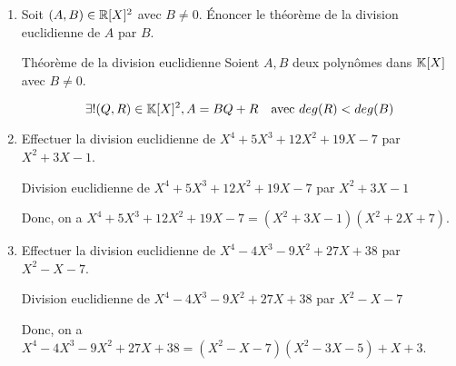 \begin{enumerate}
    \item Soit $(A, B) \in \mathbb{R}[X]^2$ avec $B \neq 0$. Énoncer le théorème de la division euclidienne de $A$ par $B$.

    \begin{theorem}[black]{Théorème de la division euclidienne}
        Soient $A, B$ deux polynômes dans $\mathbb{K}[X]$ avec $B \neq 0$.

        $$
            \exists ! (Q, R) \in \ensK[X]^2, A = BQ + R \hspace{10px} \text{avec } deg(R) < deg(B)
        $$
    \end{theorem}
    
    \item Effectuer la division euclidienne de $X^4 + 5X^3 + 12X^2 + 19X - 7$ par $X^2 + 3X - 1$.

    \begin{theorem}[black]{Division euclidienne de $X^4 + 5X^3 + 12X^2 + 19X - 7$ par $X^2 + 3X - 1$}
        \begin{center}
        \end{center}

        \vspace{10px}

        \noindent Donc, on a $X^4 + 5X^3 + 12X^2 + 19X - 7 = (X^2 + 3X - 1)(X^2 + 2X + 7)$.
    \end{theorem}
    
    \item Effectuer la division euclidienne de $X^4 - 4X^3 - 9X^2 + 27X + 38$ par $X^2 - X - 7$.

    \begin{theorem}[black]{Division euclidienne de $X^4 - 4X^3 - 9X^2 + 27X + 38$ par $X^2 - X - 7$}
        \begin{center}
        \end{center}

        \vspace{10px}

        \noindent Donc, on a $X^4 - 4X^3 - 9X^2 + 27X + 38 = (X^2 - X - 7)(X^2 - 3X - 5) + X + 3$.
    \end{theorem}
\end{enumerate}